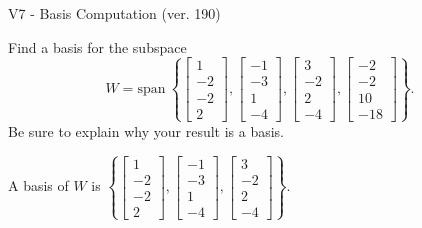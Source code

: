 \begin{exercise}
  \begin{exerciseTitle}V7 - Basis Computation (ver. 190)\end{exerciseTitle}
  \begin{exerciseStatement}
    Find a basis for the subspace 
\[W=\mathrm{span}\ \left\{\left[\begin{array}{r}
1 \\
-2 \\
-2 \\
2
\end{array}\right] , \left[\begin{array}{r}
-1 \\
-3 \\
1 \\
-4
\end{array}\right] , \left[\begin{array}{r}
3 \\
-2 \\
2 \\
-4
\end{array}\right] , \left[\begin{array}{r}
-2 \\
-2 \\
10 \\
-18
\end{array}\right]\right\}.\]
 Be sure to explain why your result is a basis.


  \end{exerciseStatement}
  \begin{exerciseAnswer}
   A basis of \(W\) is  \(\left\{\left[\begin{array}{r}
1 \\
-2 \\
-2 \\
2
\end{array}\right] , \left[\begin{array}{r}
-1 \\
-3 \\
1 \\
-4
\end{array}\right] , \left[\begin{array}{r}
3 \\
-2 \\
2 \\
-4
\end{array}\right]\right\}\).
  


  \end{exerciseAnswer}
\end{exercise}